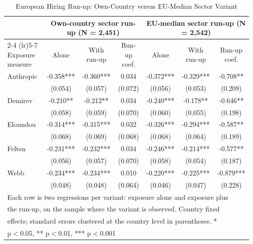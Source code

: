 \documentclass[11pt]{article}
\begin{document}
\begin{table}[H]
\centering
\scriptsize
\setlength{\tabcolsep}{3pt}
\caption{European Hiring Run-up: Own-Country versus EU-Median Sector Variant}
\begin{tabular}{lcccccc}
\hline\hline
 & \multicolumn{3}{c}{Own-country sector run-up (N = 2,451)} & \multicolumn{3}{c}{EU-median sector run-up (N = 2,542)} \\
\cmidrule(lr){2-4} \cmidrule(lr){5-7}
Exposure measure & Alone & With run-up & Run-up coef. & Alone & With run-up & Run-up coef. \\
\midrule
Anthropic & -0.358*** & -0.360*** & 0.034 & -0.372*** & -0.329*** & -0.708** \\
 & (0.054) & (0.057) & (0.072) & (0.056) & (0.053) & (0.209) \\
Demirev & -0.210** & -0.212** & 0.034 & -0.240*** & -0.178** & -0.646** \\
 & (0.058) & (0.059) & (0.070) & (0.060) & (0.055) & (0.198) \\
Eloundou & -0.314*** & -0.315*** & 0.032 & -0.326*** & -0.294*** & -0.587** \\
 & (0.068) & (0.069) & (0.068) & (0.068) & (0.064) & (0.189) \\
Felten & -0.231*** & -0.232*** & 0.034 & -0.246*** & -0.214*** & -0.577** \\
 & (0.056) & (0.057) & (0.070) & (0.058) & (0.054) & (0.187) \\
Webb & -0.234*** & -0.234*** & 0.010 & -0.220*** & -0.225*** & -0.879*** \\
 & (0.048) & (0.048) & (0.064) & (0.046) & (0.047) & (0.228) \\
\hline\hline
\multicolumn{7}{l}{\footnotesize Each row is two regressions per variant: exposure alone and exposure plus} \\
\multicolumn{7}{l}{\footnotesize the run-up, on the sample where the variant is observed. Country fixed} \\
\multicolumn{7}{l}{\footnotesize effects; standard errors clustered at the country level in parentheses. *} \\
\multicolumn{7}{l}{\footnotesize p$<$0.05, ** p$<$0.01, *** p$<$0.001} \\
\end{tabular}
\label{table:eu_runup_variants}
\end{table}
\end{document}
